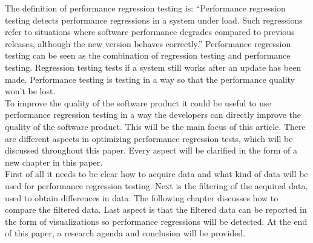 The definition of performance regression testing is: ``Performance regression testing detects performance
regressions in a system under load. Such regressions refer to
situations where software performance degrades compared to
previous releases, although the new version behaves correctly.''\cite{foo2010mining}
Performance regression testing can be seen as the combination of regression testing and performance testing. Regression testing tests if a system still works after an update has been made. Performance testing is testing in a way so that the performance quality won't be lost. \\
To improve the quality of the software product it could be useful to use performance regression testing in a way the developers can
directly improve the quality of the software product. This will be the main focus of this article. There are different aspects in optimizing performance regression tests, which will be discussed throughout this paper. Every aspect will be clarified in the form of a new chapter in this paper. \\ First of all it needs to be clear how to acquire data and what kind of data will be used for performance regression testing. Next is the filtering of the acquired data, used to obtain differences in data. The following chapter discusses how to compare the filtered data. Last aspect is that the filtered data can be reported in the form of visualizations so performance regressions will be detected. At the end of this paper, a research agenda and conclusion will be provided.


